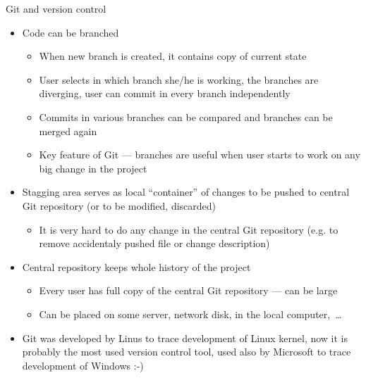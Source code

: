 \documentclass[compress, ucs, xelatex, 11pt, xcolor=svgnames, aspectratio=169,
	hyperref={
		bookmarks=true,
		unicode=true,
		colorlinks=true,
		pdftitle={Linux, command line and MetaCentrum},
		plainpages=false,
		pdfauthor={Vojtech Zeisek},
		pdfsubject={Course about use of Linux command line, writing shell scripts and using MetaCentrum of CESNET},
		pdfcreator={XeLaTeX},
		pdfkeywords={Linux, GNU, BASH, shell, command line, MetaCentrum},
		linkcolor=DarkRed, %
		anchorcolor=DarkBlue, %
		citecolor=Indigo, %
		filecolor=NavyBlue, %
		menucolor=DarkMagenta, %
		urlcolor=DarkBlue, %
		pdftex},
	url={hyphens, lowtilde} %
	]{beamer}
\begin{document}
\begin{frame}[allowframebreaks]{Git and version control}
\begin{itemize}
		\item Code can be branched
		\begin{itemize}
			\item When new branch is created, it contains copy of current state
			\item User selects in which branch she/he is working, the branches are diverging, user can commit in every branch independently
			\item Commits in various branches can be compared and branches can be merged again
			\item Key feature of Git --- branches are useful when user starts to work on any big change in the project
		\end{itemize}
		\item Stagging area serves as local \enquote{container} of changes to be pushed to central Git repository (or to be modified, discarded)
		\begin{itemize}
			\item It is very hard to do any change in the central Git repository (e.g. to remove accidentaly pushed file or change description)
		\end{itemize}
		\item Central repository keeps whole history of the project
		\begin{itemize}
			\item Every user has full copy of the central Git repository --- can be large
			\item Can be placed on some server, network disk, in the local computer,~\ldots
		\end{itemize}
		\item Git was developed by Linus to trace development of Linux kernel, now it is probably the most used version control tool, used also by Microsoft to trace development of Windows :-)
	\end{itemize}
\end{frame}
\end{document}
